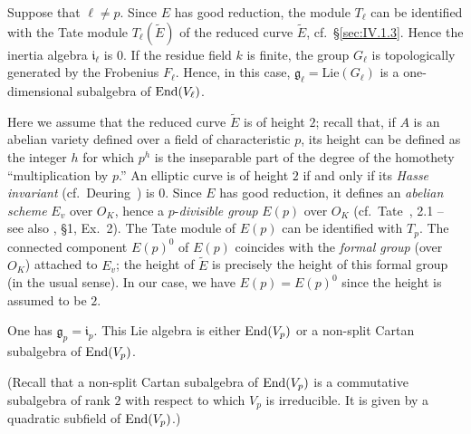 
Suppose that $\ell\neq p$. Since $E$ has good reduction, the module
$T_\ell$ can be identified with the Tate module $T_\ell(\widetilde{E})$
of the reduced curve $\widetilde{E}$, cf.~\S\ref{sec:IV.1.3}. Hence the
inertia algebra $\mathfrak{i}_\ell$ is $0$. If the residue field $k$ is
finite, the group $G_\ell$ is topologically generated by the Frobenius
$F_\ell$. Hence, in this case,
$\mathfrak{g}_\ell=\mathrm{Lie}(G_\ell)$ is a one-dimensional subalgebra
of $\mathrm{End}(V_\ell)$.


Here we assume that the reduced curve $\widetilde{E}$ is of height $2$;
recall that, if $A$ is an abelian variety defined over a field of
characteristic $p$, its height can be defined as the integer $h$ for
which $p^h$ is the inseparable part of the degree of the homothety
``multiplication by $p$.'' An elliptic curve is of height $2$ if and
only if its \emph{Hasse invariant} (cf.~Deuring~\cite{deuring}) is $0$.
Since $E$ has good reduction, it defines an \emph{abelian scheme} $E_v$
over $O_K$, hence a $p$-\emph{divisible group} $E(p)$ over $O_K$
(cf.~Tate~\cite{tate-pdiv}, 2.1 -- see also \cite{serre-pdiv}, \S1,
Ex.~2). The Tate module of $E(p)$ can be identified with $T_p$. The
connected component $E(p)^0$ of $E(p)$ coincides with the \emph{formal
group} (over $O_K$) attached to $E_v$; the height of $\widetilde{E}$ is
precisely the height of this formal group (in the usual sense). In our
case, we have $E(p)=E(p)^0$ since the height is assumed to be $2$.

\begin{theorem}
One has $\mathfrak{g}_p=\mathfrak{i}_p$. This Lie algebra is either
$\mathrm{End}(V_p)$ or a non-split Cartan subalgebra of $\mathrm{End}(V_p)$.
\end{theorem}

(Recall that a non-split Cartan subalgebra of $\mathrm{End}(V_p)$ is a
commutative subalgebra of rank $2$ with respect to which $V_p$ is
irreducible. It is given by a quadratic subfield of $\mathrm{End}(V_p)$.)

